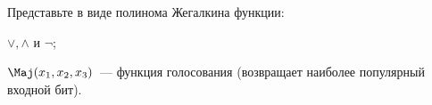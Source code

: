 Представьте в виде полинома Жегалкина функции:
\begin{enumcyr}
    \item $\lor, \land$ и $\lnot$;
    \item $\Maj(x_1, x_2, x_3)$~--- функция голосования (возвращает наиболее популярный входной бит).
\end{enumcyr}